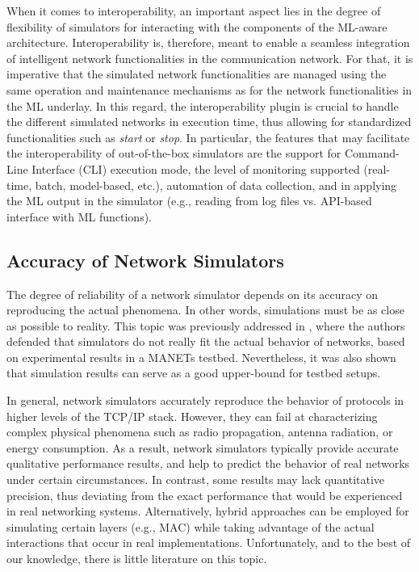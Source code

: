 \documentclass[journal]{IEEEtran}
\begin{document}
	When it comes to interoperability, an important aspect lies in the degree of flexibility of simulators for interacting with the components of the ML-aware architecture. Interoperability is, therefore, meant to enable a seamless integration of intelligent network functionalities in the communication network. For that, it is imperative that the simulated network functionalities are managed using the same operation and maintenance mechanisms as for the network functionalities in the ML underlay. In this regard, the interoperability plugin is crucial to handle the different simulated networks in execution time, thus allowing for standardized functionalities such as \textit{start} or \textit{stop}. In particular, the features that may facilitate the interoperability of out-of-the-box simulators are the support for Command-Line Interface (CLI) execution mode, the level of monitoring supported (real-time, batch, model-based, etc.), automation of data collection, and in applying the ML output in the simulator (e.g., reading from log files vs. API-based interface with ML functions).
	
	\subsection{Accuracy of Network Simulators}
	The degree of reliability of a network simulator depends on its accuracy on reproducing the actual phenomena. In other words, simulations must be as close as possible to reality. This topic was previously addressed in \cite{accuracy_manet}, where the authors defended that simulators do not really fit the actual behavior of networks, based on experimental results in a MANETs testbed. Nevertheless, it was also shown that simulation results can serve as a good upper-bound for testbed setups.
	
	In general, network simulators accurately reproduce the behavior of protocols in higher levels of the TCP/IP stack. However, they can fail at characterizing complex physical phenomena such as radio propagation, antenna radiation, or energy consumption. As a result, network simulators typically provide accurate qualitative performance results, and help to predict the behavior of real networks under certain circumstances. In contrast, some results may lack quantitative precision, thus deviating from the exact performance that would be experienced in real networking systems. Alternatively, hybrid approaches can be employed for simulating certain layers (e.g., MAC) while taking advantage of the actual interactions that occur in real implementations. Unfortunately, and to the best of our knowledge, there is little literature on this topic. 
	
\end{document}
